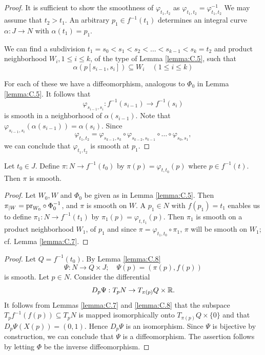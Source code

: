 \begin{proof}
  It is sufficient to show the smoothness of $\varphi_{t_1, t_2}$ as $\varphi_{t_1, t_2}=\varphi^{-1}_{t_1, t_2}$ We
  may assume that $t_2>t_1$. An arbitrary $p_1\in f^{-1}(t_1)$ determines an integral curve
  $\alpha:J\to N$ with $\alpha(t_1) = p_1$.

  We can find a subdivision $t_1=s_0<s_1<s_2<\ldots<s_{k-1}<s_k=t_2$ and product 
  neighborhood $W_i,1\le i\le k$, of the type of Lemma \ref{lemma:C.5}, such that 
  \[
    \alpha(p[s_{i-1}, s_i])\subseteq W_i\quad (1\le i\le k)
  \]
  
  For each of these we have a diffeomorphism, analogous to $\Phi_0$ in Lemma \ref{lemma:C.5}.
  It follows that 
  \[
    \varphi_{s_{i-1},s_i}:f^{-1}(s_{i-1})\to f^{-1}(s_i)
  \]
  is smooth in a neighborhood of $\alpha(s_{i-1})$. Note that $\varphi_{s_{i-1},s_i}(\alpha(s_{i-1})) = \alpha(s_i)$.
  Since 
  \[
    \varphi_{t_1, t_2} = \varphi_{s_{k-1}, s_k}\circ\varphi_{s_{k-2}, s_{k-1}}\circ\ldots\circ\varphi_{s_0, s_1},
  \]
  we can conclude that $\varphi_{t_1, t_2}$ is smooth at $p_1$.
\end{proof}

\begin{lemma}\label{lemma:C.8}
  Let $t_0\in J$. Define $\pi:N\to f^{-1}(t_0)$ by $\pi(p)=\varphi_{t, t_0}(p)$ where 
  $p\in f^{-1}(t)$. Then $\pi$ is smooth.
\end{lemma}

\begin{proof}
  Let $W_0, W$ and $\Phi_0$ be given as in Lemma \ref{lemma:C.5}. Then $\pi_{|W} = \mathrm{pr}_{W_0}\circ\Phi_0^{-1}$,
  and $\pi$ is smooth on $W$. A $p_1\in N$ with $f(p_1) = t_1$ enables us to define $\pi_1:N\to f^{-1}(t_1)$ 
  by $\pi_1(p)=\varphi_{t, t_1}(p)$. Then $\pi_1$ is smooth on a product neighborhood $W_1$, of $p_1$ and 
  since $\pi=\varphi_{t_1, t_0}\circ\pi_1$, $\pi$ will be smooth on $W_1$; cf. Lemma \ref{lemma:C.7}.
\end{proof}

\begingroup 
\def\proofname{\textup{\bfseries Proof of Theorem \ref{theorem:C.2}}}
\begin{proof}
  Let $Q = f^{-1}(t_0)$. By Lemma \ref{lemma:C.8}
  \[
    \Psi:N\to Q\times J;\quad \Psi(p) = (\pi(p), f(p))
  \]
  is smooth. Let $p\in N$. Consider the differential 
  \[
    D_p\Psi:T_pN \to T_{\pi(p)}Q\times{\ensuremath{\mathbb{R}}}.
  \]
  It follows from Lemmas \ref{lemma:C.7} and \ref{lemma:C.8} that the subspace $T_pf^{-1}(f(p))\subseteq T_pN$ 
  is mapped isomorphically onto $T_{\pi(p)}Q\times\{0\}$ and that $D_p\Psi(X(p))=(0, 1)$. Hence
  $D_p\Psi$ is an isomorphism. Since $\Psi$ is bijective by construction, we can conclude
  that $\Psi$ is a diffeomorphism. The assertion follows by letting $\Phi$ be the inverse
  diffeomorphism.
\end{proof}
\endgroup